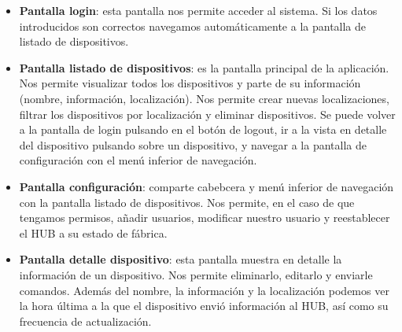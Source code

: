 \begin{itemize}
\item\textbf{Pantalla login}: esta pantalla nos permite acceder al sistema. Si los datos introducidos son correctos navegamos automáticamente 
a la pantalla de listado de dispositivos.
\item\textbf{Pantalla listado de dispositivos}: es la pantalla principal de la aplicación. Nos permite visualizar todos los dispositivos y parte
de su información (nombre, información, localización). Nos permite crear nuevas localizaciones, filtrar los dispositivos por localización y eliminar
dispositivos. Se puede volver a la pantalla de login pulsando en el botón de logout, ir a la vista en detalle del dispositivo pulsando sobre un
dispositivo, y navegar a la pantalla de configuración con el menú inferior de navegación.
\item\textbf{Pantalla configuración}: comparte cabebcera y menú inferior de navegación con la pantalla listado de dispositivos. Nos permite, en el
caso de que tengamos permisos, añadir usuarios, modificar nuestro usuario y reestablecer el HUB a su estado de fábrica.
\item\textbf{Pantalla detalle dispositivo}: esta pantalla muestra en detalle la información de un dispositivo. Nos permite eliminarlo, editarlo y
enviarle comandos. Además del nombre, la información y la localización podemos ver la hora última a la que el dispositivo envió información al HUB,
así como su frecuencia de actualización.
\end{itemize}
\newpage
